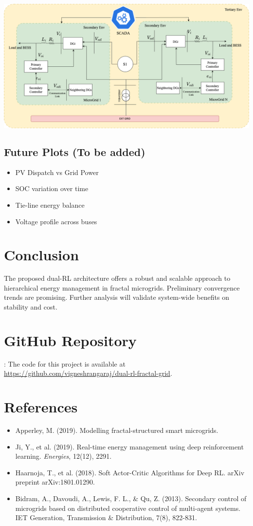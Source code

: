 \documentclass[11pt]{article}
\begin{document}
\includegraphics[width=0.9\linewidth]{./der_config.png} 
\label{fig:der_config}

\subsection{Future Plots (To be added)}
\begin{itemize}
  \item PV Dispatch vs Grid Power
  \item SOC variation over time
  \item Tie-line energy balance
  \item Voltage profile across buses
\end{itemize}

\section{Conclusion}
The proposed dual-RL architecture offers a robust and scalable approach to hierarchical energy management in fractal microgrids. Preliminary convergence trends are promising. Further analysis will validate system-wide benefits on stability and cost.

\section{GitHub Repository}:
The code for this project is available at \url{https://github.com/vigneshrangaraj/dual-rl-fractal-grid}.

\section*{References}
\begin{itemize}
  \item Apperley, M. (2019). Modelling fractal-structured smart microgrids.
  \item Ji, Y., et al. (2019). Real-time energy management using deep reinforcement learning. \textit{Energies}, 12(12), 2291.
  \item Haarnoja, T., et al. (2018). Soft Actor-Critic Algorithms for Deep RL. arXiv preprint arXiv:1801.01290.
  \item Bidram, A., Davoudi, A., Lewis, F. L., & Qu, Z. (2013). Secondary control of microgrids based on distributed cooperative control of multi‐agent systems. IET Generation, Transmission & Distribution, 7(8), 822-831.
\end{itemize}
\end{document}
